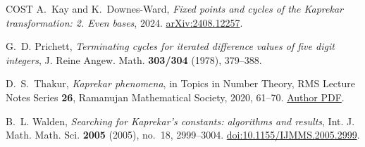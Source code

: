 \documentclass[11pt,reqno]{amsart}
\theoremstyle{remark}
\begin{document}
\begin{thebibliography}{COST}
A.~Kay and K.~Downes-Ward, \emph{Fixed points and cycles of the Kaprekar transformation: 2. Even bases}, 2024.
\href{https://arxiv.org/abs/2408.12257}{arXiv:2408.12257}.

G.~D. Prichett, \emph{Terminating cycles for iterated difference values of five digit integers}, J. Reine Angew. Math. \textbf{303/304} (1978), 379--388.

D.~S.~Thakur, \emph{Kaprekar phenomena}, in Topics in Number Theory,
RMS Lecture Notes Series \textbf{26}, Ramanujan Mathematical Society, 2020, 61--70.
\href{https://www.sas.rochester.edu/mth/sites/dinesh-thakur/kaprekar.pdf}{Author PDF}.

B.~L. Walden, \emph{Searching for Kaprekar's constants: algorithms and results}, Int. J. Math. Math. Sci. \textbf{2005} (2005), no.~18, 2999--3004.
\href{https://doi.org/10.1155/IJMMS.2005.2999}{doi:10.1155/IJMMS.2005.2999}.

\end{thebibliography}
\endgroup
\end{document}
